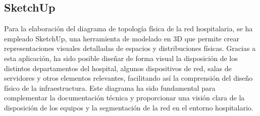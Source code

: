 \subsection{SketchUp}
Para la elaboración del diagrama de topología física de la red hospitalaria, se ha empleado SketchUp, una herramienta de modelado en 3D que permite crear representaciones 
visuales detalladas de espacios y distribuciones físicas.
Gracias a esta aplicación, ha sido posible diseñar de forma visual la disposición de los distintos departamentos del hospital, algunos dispositivos de red, salas de servidores
y otros elementos relevantes, facilitando así la comprensión del diseño físico de la infraestructura. Este diagrama ha sido fundamental para complementar la documentación técnica y 
proporcionar una visión clara de la disposición de los equipos y la segmentación de la red en el entorno hospitalario.